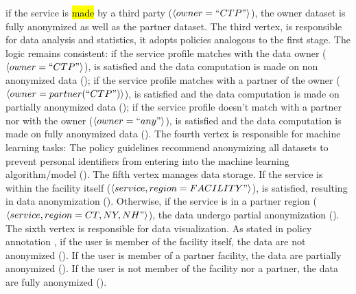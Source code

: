 if the service is \hl{made} by a third party ($\langle owner = ``CTP" \rangle$), the owner dataset is fully anonymized as well as the partner dataset.
The third vertex, is responsible for data analysis and statistics,
it adopts policies analogous to the first stage. The logic remains consistent:
if the service profile matches with the data owner ($\langle owner = ``CTP" \rangle$),  is satisfied and the data computation is made on non anonymized data ();
if the service profile matches with a partner of the owner ($\langle owner = partner(``CTP") \rangle$),  is satisfied and the data computation is made on partially anonymized data ();
if the service profile doesn't match with a partner nor with the owner ($\langle owner = ``any" \rangle$),  is satisfied and the data computation is made on fully anonymized data ().
The fourth vertex is responsible for machine learning tasks:
The policy guidelines recommend anonymizing all datasets to prevent personal identifiers from entering into the machine learning algorithm/model ().
The fifth vertex manages data storage.
If the service is within the facility itself ($\langle service,region=FACILITY"\rangle$),  is satisfied, resulting in data anonymization ().
Otherwise, if the service is in a partner region ($\langle service,region={CT,NY,NH}"\rangle$), the data undergo partial anonymization ().
The sixth vertex is responsible for data visualization.
As stated in policy annotation , if the user is member of the facility itself, the data are not anonymized ().
If the user is member of a partner facility, the data are  partially anonymized ().
If the user is not member of the facility nor a partner, the data are fully anonymized ().


